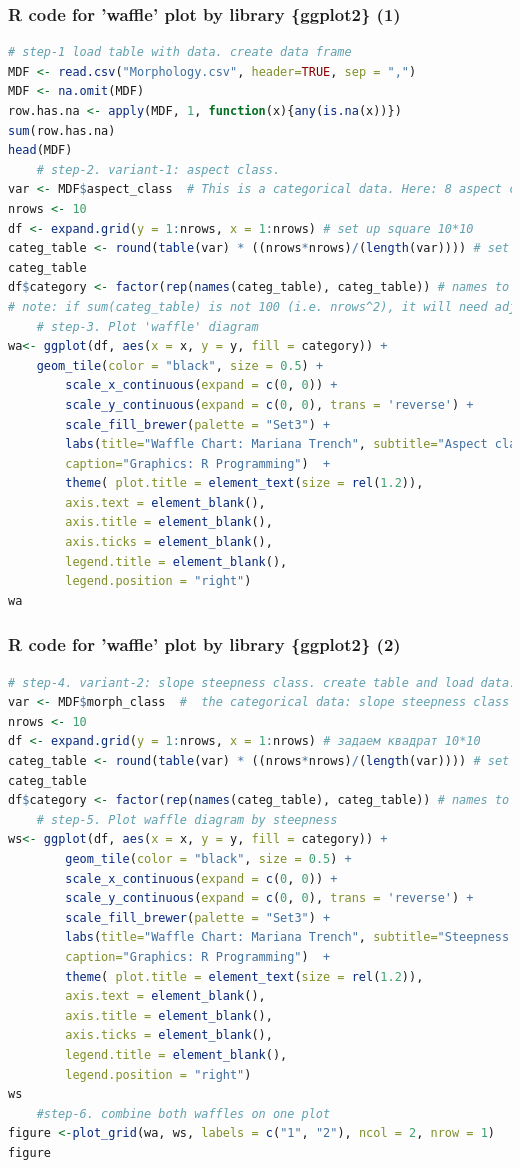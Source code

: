 \documentclass[pdflatex,compress,10pt,
	xcolor={dvipsnames,dvipsnames,svgnames,x11names,table},
	hyperref={colorlinks = true,breaklinks = true, urlcolor = NavyBlue, breaklinks = true}]{beamer}
\begin{document}
\begin{frame}[fragile,shrink=10]\frametitle{R code for 'waffle' plot by library \{ggplot2\} (1)}
\begin{lstlisting}[language=R]
	# step-1 load table with data. create data frame
MDF <- read.csv("Morphology.csv", header=TRUE, sep = ",")
MDF <- na.omit(MDF) 
row.has.na <- apply(MDF, 1, function(x){any(is.na(x))}) 
sum(row.has.na) 
head(MDF)
	# step-2. variant-1: aspect class. 
var <- MDF$aspect_class  # This is a categorical data. Here: 8 aspect classes
nrows <- 10
df <- expand.grid(y = 1:nrows, x = 1:nrows) # set up square 10*10
categ_table <- round(table(var) * ((nrows*nrows)/(length(var)))) # set up table with categorial values
categ_table
df$category <- factor(rep(names(categ_table), categ_table)) # names to be shown in a legend
# note: if sum(categ_table) is not 100 (i.e. nrows^2), it will need adjustment to make the sum to 100.
	# step-3. Plot 'waffle' diagram
wa<- ggplot(df, aes(x = x, y = y, fill = category)) +
	geom_tile(color = "black", size = 0.5) +
        scale_x_continuous(expand = c(0, 0)) +
        scale_y_continuous(expand = c(0, 0), trans = 'reverse') +
        scale_fill_brewer(palette = "Set3") +
        labs(title="Waffle Chart: Mariana Trench", subtitle="Aspect class of the basement angle",
        caption="Graphics: R Programming")  + 
        theme( plot.title = element_text(size = rel(1.2)),
        axis.text = element_blank(),
        axis.title = element_blank(),
        axis.ticks = element_blank(),
        legend.title = element_blank(),
        legend.position = "right")
wa
\end{lstlisting}
\end{frame}

\begin{frame}[fragile]\frametitle{R code for 'waffle' plot by library \{ggplot2\} (2)}
\begin{lstlisting}[language=R]
	# step-4. variant-2: slope steepness class. create table and load data.
var <- MDF$morph_class  #  the categorical data: slope steepness class
nrows <- 10
df <- expand.grid(y = 1:nrows, x = 1:nrows) # задаем квадрат 10*10
categ_table <- round(table(var) * ((nrows*nrows)/(length(var)))) # set up table with categorial values
categ_table
df$category <- factor(rep(names(categ_table), categ_table)) # names to be shown in a legend
	# step-5. Plot waffle diagram by steepness
ws<- ggplot(df, aes(x = x, y = y, fill = category)) + 
        geom_tile(color = "black", size = 0.5) +
        scale_x_continuous(expand = c(0, 0)) +
        scale_y_continuous(expand = c(0, 0), trans = 'reverse') +
        scale_fill_brewer(palette = "Set3") +
        labs(title="Waffle Chart: Mariana Trench", subtitle="Steepness angle class of the profiles 1:25",
        caption="Graphics: R Programming")  + 
        theme( plot.title = element_text(size = rel(1.2)),
        axis.text = element_blank(),
        axis.title = element_blank(),
        axis.ticks = element_blank(),
        legend.title = element_blank(),
        legend.position = "right")
ws
	#step-6. combine both waffles on one plot
figure <-plot_grid(wa, ws, labels = c("1", "2"), ncol = 2, nrow = 1)
figure
\end{lstlisting}
\end{frame}
\end{document}
